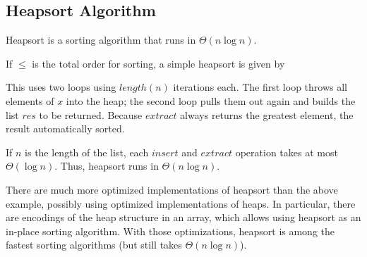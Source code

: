 \subsection{Heapsort Algorithm}\label{sec:ad:heapsort}

Heapsort is a sorting algorithm that runs in $\Theta(n\log n)$.

If $\leq$ is the total order for sorting, a simple heapsort is given by
\begin{acode}
\end{acode}

This uses two loops using $length(n)$ iterations each.
The first loop throws all elements of $x$ into the heap; the second loop pulls them out again and builds the list $res$ to be returned.
Because $extract$ always returns the greatest element, the result automatically sorted.

If $n$ is the length of the list, each $insert$ and $extract$ operation takes at most $\Theta(\log n)$.
Thus, heapsort runs in $\Theta(n\log n)$.
\medskip

There are much more optimized implementations of heapsort than the above example, possibly using optimized implementations of heaps.
In particular, there are encodings of the heap structure in an array, which allows using heapsort as an in-place sorting algorithm.
With those optimizations, heapsort is among the fastest sorting algorithms (but still takes $\Theta(n\log n)$).